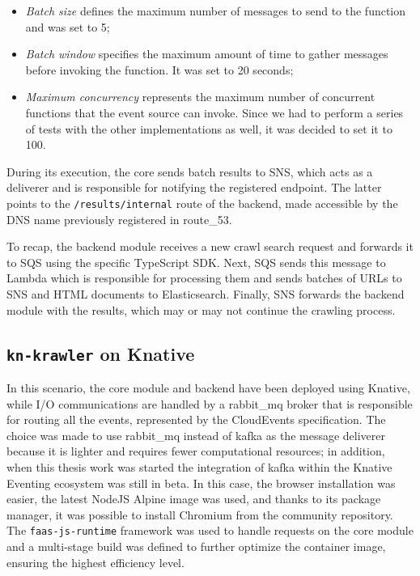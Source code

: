 \documentclass[../thesis.tex]{subfiles}
\begin{document}
\begin{itemize}
    \item \textit{Batch size} defines the maximum number of messages to send to the function and was set to 5;
    \item \textit{Batch window} specifies the maximum amount of time to gather messages before invoking the function. It was set to 20 seconds;
    \item \textit{Maximum concurrency} represents the maximum number of concurrent functions that the event source can invoke. Since we had to perform a series of tests with the other implementations as well, it was decided to set it to 100.
\end{itemize}

During its execution, the core sends batch results to \acrshort{SNS}, which acts as a deliverer and is responsible for notifying the registered endpoint. The latter points to the \texttt{/results/internal} route of the backend, made accessible by the \acrshort{DNS} name previously registered in \gls{route_53}.

To recap, the backend module receives a new crawl search request and forwards it to \acrshort{SQS} using the specific TypeScript \acrshort{SDK}. Next, \acrshort{SQS} sends this message to Lambda which is responsible for processing them and sends batches of \acrshort{URL}s to \acrshort{SNS} and \acrshort{HTML} documents to Elasticsearch. Finally, \acrshort{SNS} forwards the backend module with the results, which may or may not continue the crawling process.

\subsection{\texttt{kn-krawler} on Knative}
In this scenario, the core module and backend have been deployed using Knative, while I/O communications are handled by a \gls{rabbit_mq} broker \cite{site:knative_rabbitmq} that is responsible for routing all the events, represented by the CloudEvents \cite{site:cloudevents} specification. The choice was made to use \gls{rabbit_mq} \cite{site:rabbitmq} instead of \gls{kafka} as the message deliverer because it is lighter and requires fewer computational resources; in addition, when this thesis work was started the integration of \gls{kafka} within the Knative Eventing ecosystem was still in beta. In this case, the browser installation was easier, the latest NodeJS Alpine image was used, and thanks to its package manager, it was possible to install Chromium from the community repository. The \texttt{faas-js-runtime} framework \cite{site:faas-js-runtime} was used to handle requests on the core module and a multi-stage build was defined to further optimize the \gls{container} image, ensuring the highest efficiency level.
\end{document}
